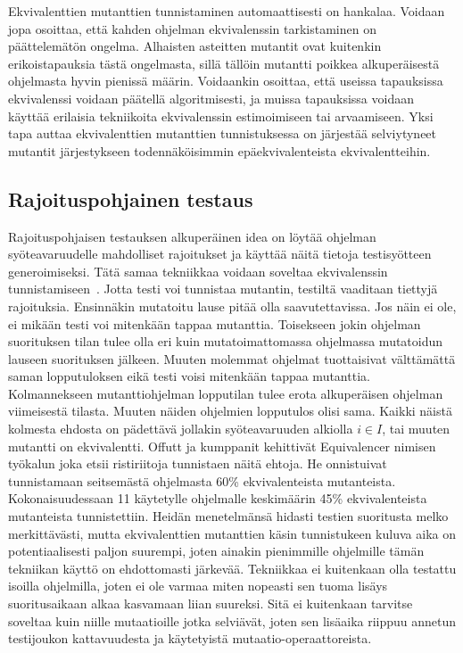\documentclass{tktltiki}
\begin{document}
Ekvivalenttien mutanttien tunnistaminen automaattisesti on hankalaa. Voidaan jopa osoittaa, että kahden ohjelman ekvivalenssin tarkistaminen on päättelemätön ongelma. Alhaisten asteitten mutantit ovat kuitenkin erikoistapauksia tästä ongelmasta, sillä tällöin mutantti poikkea alkuperäisestä ohjelmasta hyvin pienissä määrin. Voidaankin osoittaa, että useissa tapauksissa ekvivalenssi voidaan päätellä algoritmisesti, ja muissa tapauksissa voidaan käyttää erilaisia tekniikoita ekvivalenssin estimoimiseen tai arvaamiseen. Yksi tapa auttaa ekvivalenttien mutanttien tunnistuksessa on järjestää selviytyneet mutantit järjestykseen todennäköisimmin epäekvivalenteista ekvivalentteihin.

\subsection{Rajoituspohjainen testaus}
Rajoituspohjaisen testauksen alkuperäinen idea on löytää ohjelman syöteavaruudelle mahdolliset rajoitukset ja käyttää näitä tietoja testisyötteen generoimiseksi. Tätä samaa tekniikkaa voidaan soveltaa ekvivalenssin tunnistamiseen~\cite{OffuttP96}. Jotta testi voi tunnistaa mutantin, testiltä vaaditaan tiettyjä rajoituksia. Ensinnäkin mutatoitu lause pitää olla saavutettavissa. Jos näin ei ole, ei mikään testi voi mitenkään tappaa mutanttia. Toisekseen jokin ohjelman suorituksen tilan tulee olla eri kuin mutatoimattomassa ohjelmassa mutatoidun lauseen suorituksen jälkeen. Muuten molemmat ohjelmat tuottaisivat välttämättä saman lopputuloksen eikä testi voisi mitenkään tappaa mutanttia. Kolmannekseen mutanttiohjelman lopputilan tulee erota alkuperäisen ohjelman viimeisestä tilasta. Muuten näiden ohjelmien lopputulos olisi sama. Kaikki näistä kolmesta ehdosta on pädettävä jollakin syöteavaruuden alkiolla $i \in I$, tai muuten mutantti on ekvivalentti. Offutt ja kumppanit kehittivät Equivalencer nimisen työkalun joka etsii ristiriitoja tunnistaen näitä ehtoja. He onnistuivat tunnistamaan seitsemästä ohjelmasta 60\% ekvivalenteista mutanteista. Kokonaisuudessaan 11 käytetylle ohjelmalle keskimäärin 45\% ekvivalenteista mutanteista tunnistettiin. Heidän menetelmänsä hidasti testien suoritusta melko merkittävästi, mutta ekvivalenttien mutanttien käsin tunnistukeen kuluva aika on potentiaalisesti paljon suurempi, joten ainakin pienimmille ohjelmille tämän tekniikan käyttö on ehdottomasti järkevää. Tekniikkaa ei kuitenkaan olla testattu isoilla ohjelmilla, joten ei ole varmaa miten nopeasti sen tuoma lisäys suoritusaikaan alkaa kasvamaan liian suureksi. Sitä ei kuitenkaan tarvitse soveltaa kuin niille mutaatioille jotka selviävät, joten sen lisäaika riippuu annetun testijoukon kattavuudesta ja käytetyistä mutaatio-operaattoreista.
\end{document}
